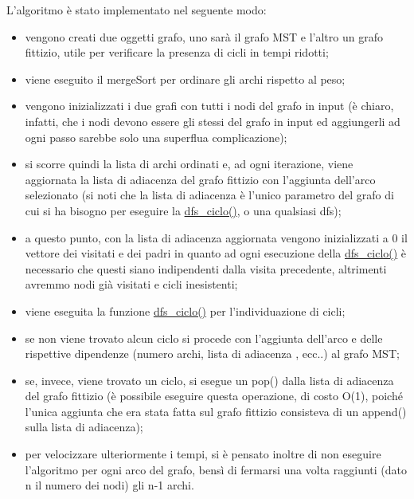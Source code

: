 L'algoritmo è stato implementato nel seguente modo:
\begin{itemize}
    
    \item vengono creati due oggetti grafo, uno sarà il grafo MST e l'altro un grafo fittizio, utile per verificare la presenza di cicli in tempi ridotti;
    
    \item viene eseguito il mergeSort per ordinare gli archi rispetto al peso;
    
    \item vengono inizializzati i due grafi con tutti i nodi del grafo in input (è chiaro, infatti, che i nodi devono essere gli stessi del grafo in input ed aggiungerli ad ogni passo sarebbe solo una superflua complicazione);
    
    \item si scorre quindi la lista di archi ordinati e, ad ogni iterazione, viene aggiornata la lista di adiacenza del grafo fittizio con l'aggiunta dell'arco selezionato (si noti che la lista di adiacenza è l'unico parametro del grafo di cui si ha bisogno per eseguire la \hyperlink{dfsciclo}{dfs\_ciclo()}, o una qualsiasi dfs);
    
    \item a questo punto, con la lista di adiacenza aggiornata vengono inizializzati a 0 il vettore dei visitati e dei padri in quanto ad ogni esecuzione della \hyperlink{dfsciclo}{dfs\_ciclo()} è necessario che questi siano indipendenti dalla visita precedente, altrimenti avremmo nodi già visitati e cicli inesistenti;
    
    \item viene eseguita la funzione \hyperlink{dfsciclo}{dfs\_ciclo()} per l'individuazione di cicli;
    
    \item se non viene trovato alcun ciclo si procede con l'aggiunta dell'arco e delle rispettive dipendenze (numero archi, lista di adiacenza , ecc..) al grafo MST;
    
    \item se, invece, viene trovato un ciclo, si esegue un pop() dalla lista di adiacenza del grafo fittizio (è possibile eseguire questa operazione, di costo O(1), poiché l'unica aggiunta che era stata fatta sul grafo fittizio consisteva di un append() sulla lista di adiacenza);
    
    \item per velocizzare ulteriormente i tempi, si è pensato inoltre di non eseguire l'algoritmo per ogni arco del grafo, bensì di fermarsi una volta raggiunti (dato n il numero dei nodi) gli n-1 archi.
    
\end{itemize}
